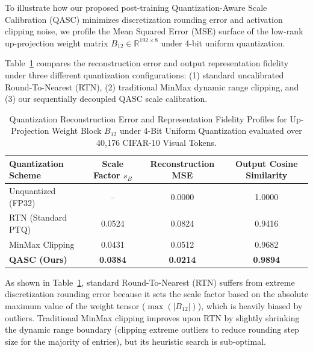 To illustrate how our proposed post-training Quantization-Aware Scale Calibration (QASC) minimizes discretization rounding error and activation clipping noise, we profile the Mean Squared Error (MSE) surface of the low-rank up-projection weight matrix $B_{12} \in \mathbb{R}^{192 \times 8}$ under 4-bit uniform quantization.

Table~\ref{tab:qasc_grid_mse} compares the reconstruction error and output representation fidelity under three different quantization configurations: (1) standard uncalibrated Round-To-Nearest (RTN), (2) traditional MinMax dynamic range clipping, and (3) our sequentially decoupled QASC scale calibration.

\begin{table}[h]
    \caption{Quantization Reconstruction Error and Representation Fidelity Profiles for Up-Projection Weight Block $B_{12}$ under 4-Bit Uniform Quantization evaluated over 40,176 CIFAR-10 Visual Tokens.}
    \label{tab:qasc_grid_mse}
    \vskip 0.15in
    \begin{center}
    \begin{small}
    \begin{sc}
    \begin{tabular}{lccc}
        \toprule
        Quantization Scheme & Scale Factor $s_B$ & Reconstruction MSE & Output Cosine Similarity \\
        \midrule
        Unquantized (FP32) & -- & 0.0000 & 1.0000 \\
        RTN (Standard PTQ) & 0.0524 & 0.0824 & 0.9416 \\
        MinMax Clipping     & 0.0431 & 0.0512 & 0.9682 \\
        \textbf{QASC (Ours)} & \textbf{0.0384} & \textbf{0.0214} & \textbf{0.9894} \\
        \bottomrule
    \end{tabular}
    \end{sc}
    \end{small}
    \end{center}
    \vskip -0.1in
\end{table}

As shown in Table~\ref{tab:qasc_grid_mse}, standard Round-To-Nearest (RTN) suffers from extreme discretization rounding error because it sets the scale factor based on the absolute maximum value of the weight tensor ($\max(|B_{12}|)$), which is heavily biased by outliers. Traditional MinMax clipping improves upon RTN by slightly shrinking the dynamic range boundary (clipping extreme outliers to reduce rounding step size for the majority of entries), but its heuristic search is sub-optimal.

